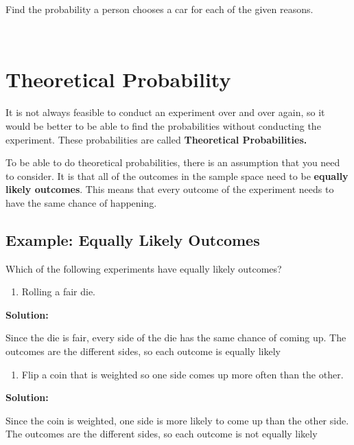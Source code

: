 \documentclass[
]{book}
\providecommand{\tightlist}{%
  \setlength{\itemsep}{0pt}\setlength{\parskip}{0pt}}
\begin{document}
Find the probability a person chooses a car for each of the given reasons.

\textbf{\\
}

\hypertarget{theoretical-probability}{%
\section{Theoretical Probability}\label{theoretical-probability}}

It is not always feasible to conduct an experiment over and over again, so it would be better to be able to find the probabilities without conducting the experiment. These probabilities are called \textbf{Theoretical Probabilities.}

To be able to do theoretical probabilities, there is an assumption that you need to consider. It is that all of the outcomes in the sample space need to be \textbf{equally likely outcomes}. This means that every outcome of the experiment needs to have the same chance of happening.

\hypertarget{example-equally-likely-outcomes}{%
\subsection{Example: Equally Likely Outcomes}\label{example-equally-likely-outcomes}}

Which of the following experiments have equally likely outcomes?

\begin{enumerate}
\def\labelenumi{\alph{enumi}.}
\tightlist
\item
  Rolling a fair die.
\end{enumerate}

\textbf{Solution:}

Since the die is fair, every side of the die has the same chance of coming up. The outcomes are the different sides, so each outcome is equally likely

\begin{enumerate}
\def\labelenumi{\alph{enumi}.}
\setcounter{enumi}{1}
\tightlist
\item
  Flip a coin that is weighted so one side comes up more often than the other.
\end{enumerate}

\textbf{Solution:}

Since the coin is weighted, one side is more likely to come up than the other side. The outcomes are the different sides, so each outcome is not equally likely
\end{document}
